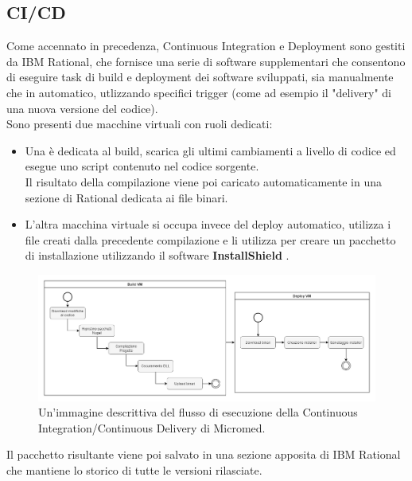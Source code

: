 \documentclass[\main/Tesi.tex]{subfiles}
\begin{document}
\subsection{CI/CD}
Come accennato in precedenza, Continuous Integration e Deployment sono gestiti da IBM Rational, che fornisce una serie di software supplementari che consentono di eseguire task di build e deployment dei software sviluppati, sia manualmente che in automatico, utlizzando specifici trigger (come ad esempio il "delivery" di una nuova versione del codice).\\
Sono presenti due macchine virtuali con ruoli dedicati:
\begin{itemize}
    \item Una è dedicata al build, scarica gli ultimi cambiamenti a livello di codice ed esegue uno script contenuto nel codice sorgente.\\Il risultato della compilazione viene poi caricato automaticamente in una sezione di Rational dedicata ai file binari.
    \item L'altra macchina virtuale si occupa invece del deploy automatico, utilizza i file creati dalla precedente compilazione e li utilizza per creare un pacchetto di installazione utilizzando il software \textbf{InstallShield} \cite{installshield}.
\end{itemize}

\begin{figure}[h]
    \caption{Un'immagine descrittiva del flusso di esecuzione della Continuous Integration/Continuous Delivery di Micromed.}
    \includegraphics[width=\textwidth]{../images/ci.png}
\end{figure}

Il pacchetto risultante viene poi salvato in una sezione apposita di IBM Rational che mantiene lo storico di tutte le versioni rilasciate.
\end{document}
